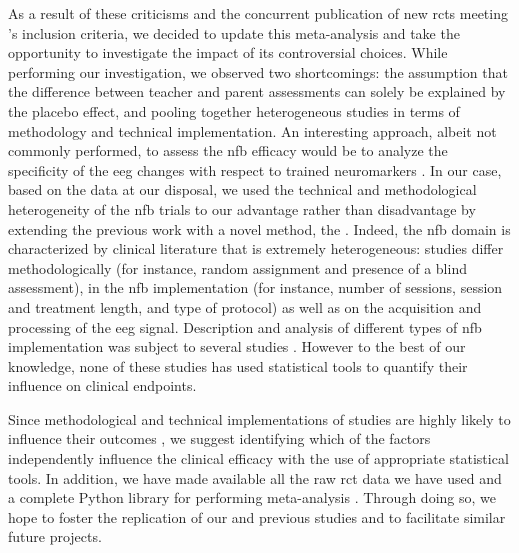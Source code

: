 As a result of these criticisms and the concurrent publication of new \glspl{rct} meeting \citeauthor{Cortese2016}'s inclusion criteria, we
decided to update this meta-analysis and take the opportunity to investigate the impact of its controversial choices.
While performing our investigation, we observed two shortcomings: the assumption that the difference between teacher and parent
assessments can solely be explained by the placebo effect, and pooling together heterogeneous studies in terms of methodology and technical
implementation. An interesting approach, albeit not commonly performed, to assess the \gls{nfb} efficacy would be to analyze the specificity of the \gls{eeg} changes with respect 
to trained neuromarkers \citep{Maurizio2014}. In our case, based on the data at our disposal, we used the technical and methodological heterogeneity 
of the \gls{nfb} trials to our advantage rather than disadvantage by extending the previous work with a novel method, the . Indeed, the \gls{nfb} domain is 
characterized by clinical literature that is extremely heterogeneous: studies differ methodologically (for instance, random assignment and 
presence of a blind assessment), in the \gls{nfb} implementation (for instance, number of sessions, session and treatment length,
and type of protocol) as well as on the acquisition and processing of the \gls{eeg} signal. Description and analysis of different types 
of \gls{nfb} implementation was subject to several studies \citep{Arns2014, Enriquez2017, Vernon2004, Jeunet2018}. However to the best of our knowledge, none 
of these studies has used statistical tools to quantify their influence on clinical endpoints.

Since methodological and technical implementations of studies are highly likely to influence their outcomes \citep{Congedo2004}, we suggest 
identifying which of the factors independently influence the clinical efficacy with the use of appropriate statistical tools. 
In addition, we have made available all the raw \gls{rct} data we have used and a complete Python library for performing meta-analysis \citep{Bussalb2019}. 
Through doing so, we hope to foster the replication of our and previous studies and to facilitate similar future projects.







